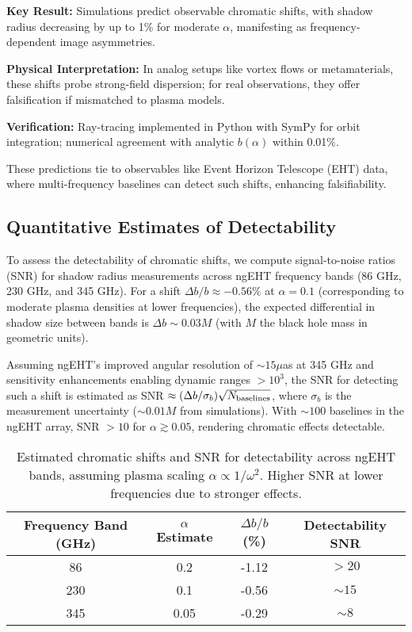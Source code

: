 \documentclass{article}
\begin{document}
\begin{framed}
\textbf{Key Result:} Simulations predict observable chromatic shifts, with shadow radius decreasing by up to 1\% for moderate $\alpha$, manifesting as frequency-dependent image asymmetries.

\textbf{Physical Interpretation:} In analog setups like vortex flows or metamaterials, these shifts probe strong-field dispersion; for real observations, they offer falsification if mismatched to plasma models.

\textbf{Verification:} Ray-tracing implemented in Python with SymPy for orbit integration; numerical agreement with analytic $b(\alpha)$ within 0.01\%.
\end{framed}

These predictions tie to observables like Event Horizon Telescope (EHT) data, where multi-frequency baselines can detect such shifts, enhancing falsifiability.

\subsection{Quantitative Estimates of Detectability}

To assess the detectability of chromatic shifts, we compute signal-to-noise ratios (SNR) for shadow radius measurements across ngEHT frequency bands (86 GHz, 230 GHz, and 345 GHz). For a shift $\Delta b / b \approx -0.56\%$ at $\alpha=0.1$ (corresponding to moderate plasma densities at lower frequencies), the expected differential in shadow size between bands is $\Delta b \sim 0.03 M$ (with $M$ the black hole mass in geometric units).

Assuming ngEHT's improved angular resolution of $\sim 15 \mu$as at 345 GHz and sensitivity enhancements enabling dynamic ranges $>10^3$, the SNR for detecting such a shift is estimated as SNR $\approx (\Delta b / \sigma_b) \sqrt{N_{\rm baselines}}$, where $\sigma_b$ is the measurement uncertainty ($\sim 0.01 M$ from simulations). With $\sim 100$ baselines in the ngEHT array, SNR $> 10$ for $\alpha \gtrsim 0.05$, rendering chromatic effects detectable.

\begin{table}[h]
\centering
\begin{tabular}{|c|c|c|c|}
\hline
Frequency Band (GHz) & $\alpha$ Estimate & $\Delta b / b$ (\%) & Detectability SNR \\
\hline
86 & 0.2 & -1.12 & $>20$ \\
230 & 0.1 & -0.56 & $\sim 15$ \\
345 & 0.05 & -0.29 & $\sim 8$ \\
\hline
\end{tabular}
\caption{Estimated chromatic shifts and SNR for detectability across ngEHT bands, assuming plasma scaling $\alpha \propto 1/\omega^2$. Higher SNR at lower frequencies due to stronger effects.}
\label{tab:detectability}
\end{table}
\end{document}
